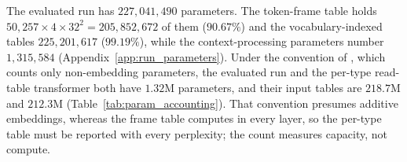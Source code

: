 \documentclass[twoside,11pt]{article}
\begin{document}
The evaluated run has $227{,}041{,}490$ parameters. %
The token-frame table holds $50{,}257\times4\times32^2=205{,}852{,}672$ of them ($90.67\%$) and the vocabulary-indexed tables $225{,}201{,}617$ ($99.19\%$), %
while the context-processing parameters number $1{,}315{,}584$ (Appendix~\ref{app:run_parameters}). %
Under the convention of \citet{Kaplan2020Scaling}, which counts only non-embedding parameters, the evaluated run and the per-type read-table transformer both have $1.32$M parameters, and their input tables are $218.7$M and $212.3$M (Table~\ref{tab:param_accounting}). %
That convention presumes additive embeddings, whereas the frame table computes in every layer, so the per-type table must be reported with every perplexity; the count measures capacity, not compute.
\end{document}
